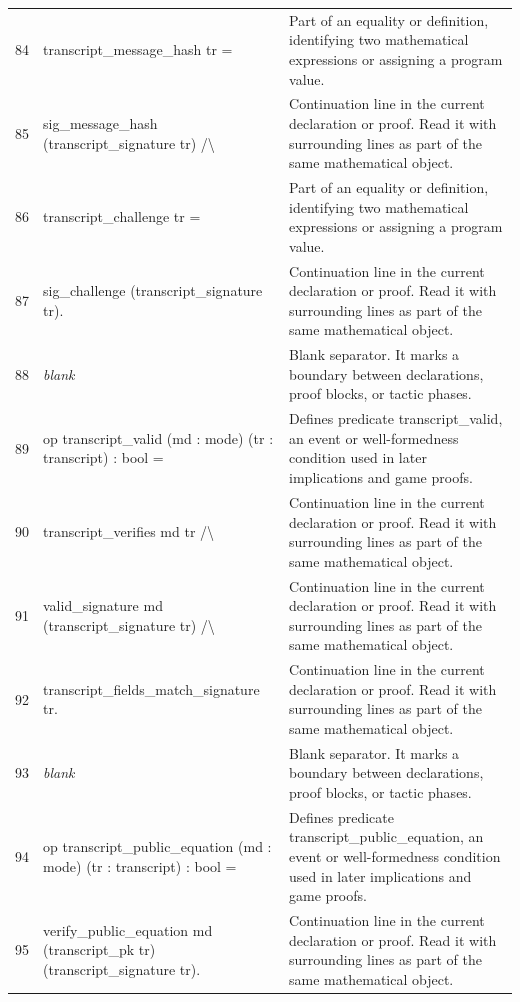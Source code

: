 \documentclass[10pt]{article}
\begin{document}
\begin{longtable}{r L{0.53\textwidth} L{0.37\textwidth}}
84 & {\ttfamily\scriptsize   transcript\_message\_hash tr =} & Part of an equality or definition, identifying two mathematical expressions or assigning a program value. \\
85 & {\ttfamily\scriptsize     sig\_message\_hash (transcript\_signature tr) /\textbackslash{}} & Continuation line in the current declaration or proof.  Read it with surrounding lines as part of the same mathematical object. \\
86 & {\ttfamily\scriptsize   transcript\_challenge tr =} & Part of an equality or definition, identifying two mathematical expressions or assigning a program value. \\
87 & {\ttfamily\scriptsize     sig\_challenge (transcript\_signature tr).} & Continuation line in the current declaration or proof.  Read it with surrounding lines as part of the same mathematical object. \\
88 & {\ttfamily\scriptsize \emph{blank}} & Blank separator.  It marks a boundary between declarations, proof blocks, or tactic phases. \\
89 & {\ttfamily\scriptsize op transcript\_valid (md : mode) (tr : transcript) : bool =} & Defines predicate transcript\_valid, an event or well-formedness condition used in later implications and game proofs. \\
90 & {\ttfamily\scriptsize   transcript\_verifies md tr /\textbackslash{}} & Continuation line in the current declaration or proof.  Read it with surrounding lines as part of the same mathematical object. \\
91 & {\ttfamily\scriptsize   valid\_signature md (transcript\_signature tr) /\textbackslash{}} & Continuation line in the current declaration or proof.  Read it with surrounding lines as part of the same mathematical object. \\
92 & {\ttfamily\scriptsize   transcript\_fields\_match\_signature tr.} & Continuation line in the current declaration or proof.  Read it with surrounding lines as part of the same mathematical object. \\
93 & {\ttfamily\scriptsize \emph{blank}} & Blank separator.  It marks a boundary between declarations, proof blocks, or tactic phases. \\
94 & {\ttfamily\scriptsize op transcript\_public\_equation (md : mode) (tr : transcript) : bool =} & Defines predicate transcript\_public\_equation, an event or well-formedness condition used in later implications and game proofs. \\
95 & {\ttfamily\scriptsize   verify\_public\_equation md (transcript\_pk tr) (transcript\_signature tr).} & Continuation line in the current declaration or proof.  Read it with surrounding lines as part of the same mathematical object. \\

\end{longtable}
\end{document}
